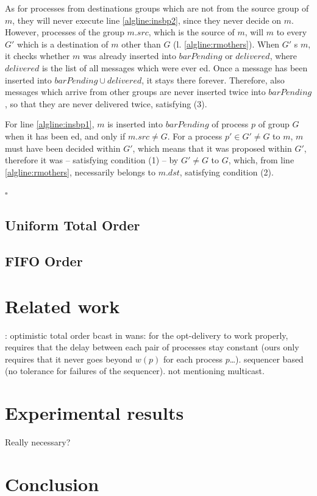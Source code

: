 \documentclass[times, 10pt]{article}
\begin{document}
As for processes from destinations groups which are not from the source group of $m$, they will never execute line \ref{algline:insbp2}, since they never decide on $m$. However, processes of the group $m.src$, which is the source of $m$, will \rmc{} $m$ to every $G'$ which is a destination of $m$ other than $G$ (l. \ref{algline:rmothers}). When $G'$ \rmd{}s $m$, it checks whether $m$ was already inserted into $barPending$ or $delivered$, where $delivered$ is the list of all messages which were ever \cmd{}ed. Once a message has been inserted into \mbox{$barPending \cup delivered$}, it stays there forever. Therefore, also messages which arrive from other groups are never inserted twice into $barPending$, so that they are never delivered twice, satisfying (3).

For line \ref{algline:insbp1}, $m$ is inserted into $barPending$ of process $p$ of group $G$ when it has been \rmd{}ed, and only if $m.src \neq G$. For a process $p' \in G' \neq G$ to \rmc{} $m$, $m$ must have been decided within $G'$, which means that it was proposed within $G'$, therefore it was \cms{} -- satisfying condition (1) -- by $G' \neq G$ to $G$, which, from line \ref{algline:rmothers}, necessarily belongs to $m.dst$, satisfying condition (2).

\begin{flushright}
$\square$
\end{flushright}

\subsection{Uniform Total Order}

\subsection{FIFO Order}

\section{Related work}

\cite{sousa2002oto}: optimistic total order bcast in wans: for the opt-delivery to work properly, requires that the delay between each pair of processes stay constant (ours only requires that it never goes beyond $w(p)$ for each process $p$\ldots). sequencer based (no tolerance for failures of the sequencer). not mentioning multicast.

\section{Experimental results}

Really necessary?

\section{Conclusion}

%
%


\end{document}
